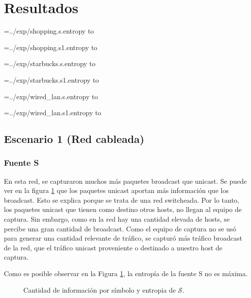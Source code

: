 \section{Resultados}

\newread\tmp

\openin\tmp=../exp/shopping.s.entropy
\read\tmp to \ShoppingSEntropy
\closein\tmp

\openin\tmp=../exp/shopping.s1.entropy
\read\tmp to \ShoppingSOneEntropy
\closein\tmp

\openin\tmp=../exp/starbucks.s.entropy
\read\tmp to \StarbucksSEntropy
\closein\tmp

\openin\tmp=../exp/starbucks.s1.entropy
\read\tmp to \StarbucksSOneEntropy
\closein\tmp

\openin\tmp=../exp/wired_lan.s.entropy
\read\tmp to \WiredLanSEntropy
\closein\tmp

\openin\tmp=../exp/wired_lan.s1.entropy
\read\tmp to \WiredLanSOneEntropy
\closein\tmp

\subsection{Escenario 1 (Red cableada)}

\subsubsection{Fuente S}

En esta red, se capturaron muchos más paquetes broadcast que unicast. Se puede ver en la figura \ref{res:esc1:fig1}
que los paquetes unicast aportan más información que los broadcast. Esto se explica porque se trata de una red switcheada. Por lo tanto, los paquetes unicast que tienen como destino otros hosts, no llegan al equipo de captura. Sin embargo, como en la red hay una cantidad elevada de hosts, se percibe una gran cantidad de broadcast. Como el equipo de captura no se usó para generar una cantidad relevante de tráfico, se capturó más tráfico broadcast de la red, que el tráfico unicast proveniente o destinado a nuestro host de captura.

Como es posible observar en la Figura \ref{res:esc1:fig1}, la entropía de la fuente S no es máxima.

\begin{figure}[h]
	\caption{Cantidad de información por símbolo y entropia de $\mathcal{S}$.}
    \label{res:esc1:fig1}
\end{figure}
    
